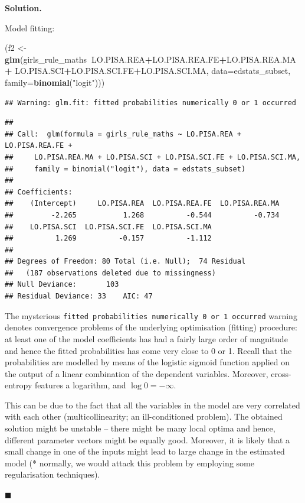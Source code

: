 \documentclass[10pt,b5paper,krantz1]{krantz}
\newenvironment{Shaded}{\begin{snugshade}}{\end{snugshade}}
\newcommand{\DataTypeTok}[1]{\textcolor[rgb]{0.27,0.27,0.27}{#1}}
\newcommand{\KeywordTok}[1]{\textcolor[rgb]{0.27,0.27,0.27}{\textbf{#1}}}
\newcommand{\NormalTok}[1]{#1}
\newcommand{\OperatorTok}[1]{\textcolor[rgb]{0.43,0.43,0.43}{\textbf{#1}}}
\newcommand{\StringTok}[1]{\textcolor[rgb]{0.5,0.5,0.5}{#1}}
\newenvironment{solution}{%
\bigskip\noindent\textbf{Solution. }%
\it\ignorespaces%
\ignorespaces%
}{\ignorespaces%
\hfill$\blacksquare$%
}
\begin{document}
\begin{solution}

Model fitting:

\begin{Shaded}
\begin{Highlighting}[]
\NormalTok{(f2 <-}\StringTok{ }\KeywordTok{glm}\NormalTok{(girls_rule_maths}\OperatorTok{~}\NormalTok{LO.PISA.REA}\OperatorTok{+}\NormalTok{LO.PISA.REA.FE}\OperatorTok{+}\NormalTok{LO.PISA.REA.MA}\OperatorTok{+}
\StringTok{                            }\NormalTok{LO.PISA.SCI}\OperatorTok{+}\NormalTok{LO.PISA.SCI.FE}\OperatorTok{+}\NormalTok{LO.PISA.SCI.MA,}
    \DataTypeTok{data=}\NormalTok{edstats_subset, }\DataTypeTok{family=}\KeywordTok{binomial}\NormalTok{(}\StringTok{"logit"}\NormalTok{)))}
\end{Highlighting}
\end{Shaded}

\begin{verbatim}
## Warning: glm.fit: fitted probabilities numerically 0 or 1 occurred
\end{verbatim}

\begin{verbatim}
## 
## Call:  glm(formula = girls_rule_maths ~ LO.PISA.REA + LO.PISA.REA.FE + 
##     LO.PISA.REA.MA + LO.PISA.SCI + LO.PISA.SCI.FE + LO.PISA.SCI.MA, 
##     family = binomial("logit"), data = edstats_subset)
## 
## Coefficients:
##    (Intercept)     LO.PISA.REA  LO.PISA.REA.FE  LO.PISA.REA.MA  
##         -2.265           1.268          -0.544          -0.734  
##    LO.PISA.SCI  LO.PISA.SCI.FE  LO.PISA.SCI.MA  
##          1.269          -0.157          -1.112  
## 
## Degrees of Freedom: 80 Total (i.e. Null);  74 Residual
##   (187 observations deleted due to missingness)
## Null Deviance:       103 
## Residual Deviance: 33    AIC: 47
\end{verbatim}

The mysterious \texttt{fitted\ probabilities\ numerically\ 0\ or\ 1\ occurred} warning
denotes convergence problems of the underlying optimisation (fitting) procedure:
at least one of the model coefficients has had a fairly large order
of magnitude and hence the fitted probabilities has come very close to 0 or 1.
Recall that the probabilities are modelled by means of the logistic sigmoid
function applied on the output of a linear combination of the dependent variables.
Moreover, cross-entropy features a logarithm, and \(\log 0 = -\infty\).

This can be due to the fact that all the variables in the model are very
correlated with each other (multicollinearity; an ill-conditioned problem).
The obtained solution might be unstable -- there might be many local optima
and hence, different parameter vectors might be equally good.
Moreover, it is likely that a small change in one of the inputs might
lead to large change in the estimated model
(* normally, we would attack this problem by employing
some regularisation techniques).


\end{solution}
\end{document}
